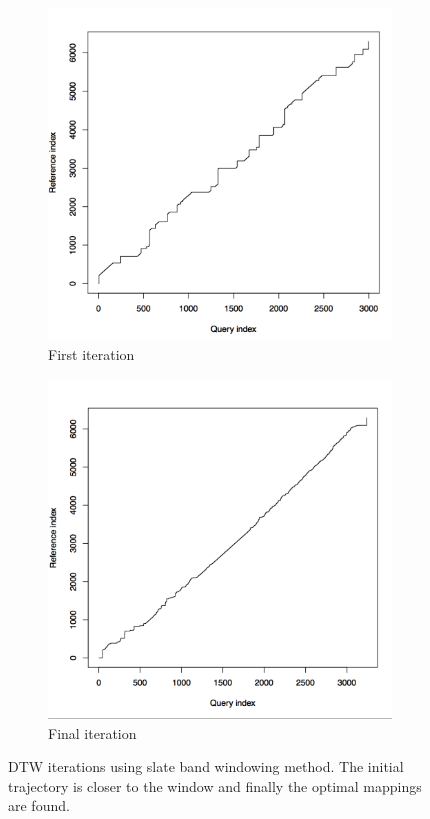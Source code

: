 \documentclass[hidelinks,BTech]{iitmdiss}
\begin{document}
\begin{figure}[H]
  \centering
  \begin{subfigure}[t]{0.48\textwidth}
  \includegraphics[width=\textwidth]{DTW_with_band_iter_1.png}
      \caption{First iteration}
  \end{subfigure}
  \begin{subfigure}[t]{0.48\textwidth}
    \centering
      \includegraphics[width=\textwidth]{DTW_with_band_iter_final.png}
      \caption{Final iteration}
  \end{subfigure}
  \caption{DTW iterations using slate band windowing method. The initial trajectory is closer to the window and finally the optimal mappings are found.}
\end{figure}
\end{document}
